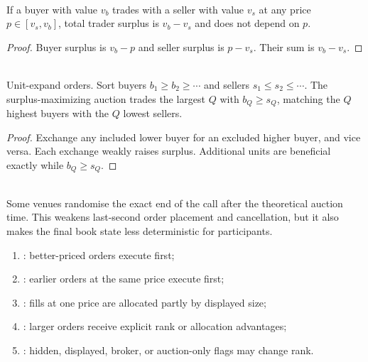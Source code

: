 \begin{lemma} \\
If a buyer with value $v_b$ trades with a seller with value $v_s$ at any price $p\in[v_s,v_b]$, total trader surplus is $v_b-v_s$ and does not depend on $p$.
\begin{proof}
Buyer surplus is $v_b-p$ and seller surplus is $p-v_s$. Their sum is $v_b-v_s$.
\end{proof}
\end{lemma}

\begin{proposition} \\
Unit-expand orders. Sort buyers $b_1\geq b_2\geq\cdots$ and sellers $s_1\leq s_2\leq\cdots$. The surplus-maximizing auction trades the largest $Q$ with $b_Q\geq s_Q$, matching the $Q$ highest buyers with the $Q$ lowest sellers.
\begin{proof}
Exchange any included lower buyer for an excluded higher buyer, and vice versa. Each exchange weakly raises surplus. Additional units are beneficial exactly while $b_Q\geq s_Q$.
\end{proof}
\end{proposition}

\begin{marketrule} \\
Some venues randomise the exact end of the call after the theoretical auction time. This weakens last-second order placement and cancellation, but it also makes the final book state less deterministic for participants.
\end{marketrule}

\begin{taxonomy} 
\begin{enumerate}[label=\roman*.]
\setlength{\itemsep}{0pt}
\item {}: better-priced orders execute first;
\item {}: earlier orders at the same price execute first;
\item {}: fills at one price are allocated partly by displayed size;
\item {}: larger orders receive explicit rank or allocation advantages;
\item {}: hidden, displayed, broker, or auction-only flags may change rank.
\end{enumerate}
\end{taxonomy}

